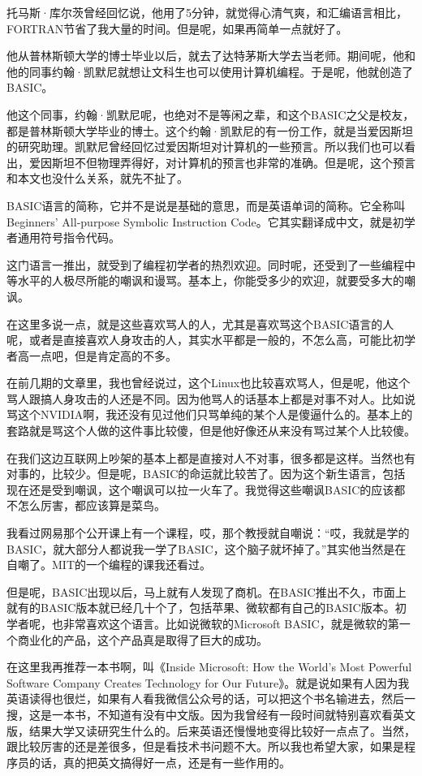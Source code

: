 \documentclass[
  letterpaper,
  DIV=11,
  numbers=noendperiod]{scrreprt}
\begin{document}
托马斯·库尔茨曾经回忆说，他用了5分钟，就觉得心清气爽，和汇编语言相比，FORTRAN节省了我大量的时间。但是呢，如果再简单一点就好了。

他从普林斯顿大学的博士毕业以后，就去了达特茅斯大学去当老师。期间呢，他和他的同事约翰·凯默尼就想让文科生也可以使用计算机编程。于是呢，他就创造了BASIC。

他这个同事，约翰·凯默尼呢，也绝对不是等闲之辈，和这个BASIC之父是校友，都是普林斯顿大学毕业的博士。这个约翰·凯默尼的有一份工作，就是当爱因斯坦的研究助理。凯默尼曾经回忆过爱因斯坦对计算机的一些预言。所以我们也可以看出，爱因斯坦不但物理弄得好，对计算机的预言也非常的准确。但是呢，这个预言和本文也没什么关系，就先不扯了。

BASIC语言的简称，它并不是说是基础的意思，而是英语单词的简称。它全称叫Beginners'
All-purpose Symbolic Instruction
Code。它其实翻译成中文，就是初学者通用符号指令代码。

这门语言一推出，就受到了编程初学者的热烈欢迎。同时呢，还受到了一些编程中等水平的人极尽所能的嘲讽和谩骂。基本上，你能受多少的欢迎，就要受多大的嘲讽。

在这里多说一点，就是这些喜欢骂人的人，尤其是喜欢骂这个BASIC语言的人呢，或者是直接喜欢人身攻击的人，其实水平都是一般的，不怎么高，可能比初学者高一点吧，但是肯定高的不多。

在前几期的文章里，我也曾经说过，这个Linux也比较喜欢骂人，但是呢，他这个骂人跟搞人身攻击的人还是不同。因为他骂人的话基本上都是对事不对人。比如说骂这个NVIDIA啊，我还没有见过他们只骂单纯的某个人是傻逼什么的。基本上的套路就是骂这个人做的这件事比较傻，但是他好像还从来没有骂过某个人比较傻。

在我们这边互联网上吵架的基本上都是直接对人不对事，很多都是这样。当然也有对事的，比较少。但是呢，BASIC的命运就比较苦了。因为这个新生语言，包括现在还是受到嘲讽，这个嘲讽可以拉一火车了。我觉得这些嘲讽BASIC的应该都不怎么厉害，都应该算是菜鸟。

我看过网易那个公开课上有一个课程，哎，那个教授就自嘲说：``哎，我就是学的BASIC，就大部分人都说我一学了BASIC，这个脑子就坏掉了。''其实他当然是在自嘲了。MIT的一个编程的课我还看过。

但是呢，BASIC出现以后，马上就有人发现了商机。在BASIC推出不久，市面上就有的BASIC版本就已经几十个了，包括苹果、微软都有自己的BASIC版本。初学者呢，也非常喜欢这个语言。比如说微软的Microsoft
BASIC，就是微软的第一个商业化的产品，这个产品真是取得了巨大的成功。

在这里我再推荐一本书啊，叫《Inside Microsoft: How the World's Most
Powerful Software Company Creates Technology for Our
Future》。就是说如果有人因为我英语读得也很烂，如果有人看我微信公众号的话，可以把这个书名输进去，然后一搜，这是一本书，不知道有没有中文版。因为我曾经有一段时间就特别喜欢看英文版，结果大学又读研究生什么的。后来英语还慢慢地变得比较好一点点了。当然，跟比较厉害的还是差很多，但是看技术书问题不大。所以我也希望大家，如果是程序员的话，真的把英文搞得好一点，还是有一些作用的。
\end{document}
